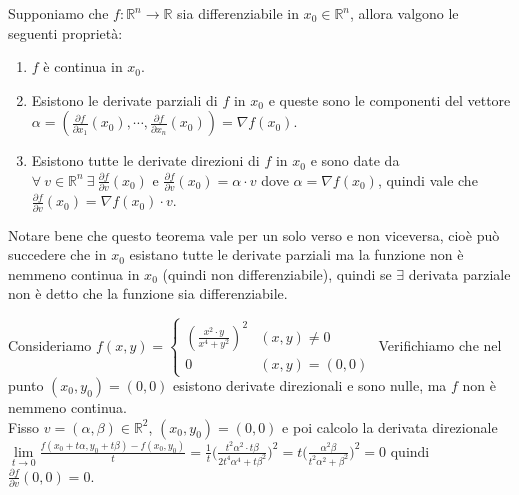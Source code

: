 \begin{theorem}\label{teorema-differenziabilità}
Supponiamo che $f: \mathbb{R}^n \to \mathbb{R}$ sia differenziabile in $x_0 \in \mathbb{R}^n$, allora valgono le seguenti proprietà:
\begin{enumerate}
    \item $f$ è continua in $x_0$.
    \item Esistono le derivate parziali di $f$ in $x_0$ e queste sono le componenti del vettore $\alpha = (\frac{\partial f}{\partial x_1}(x_0), \cdots, \frac{\partial f}{\partial x_n}(x_0)) = \nabla f(x_0)$.
    \item Esistono tutte le derivate direzioni di $f$ in $x_0$ e sono date da $\forall \: v \in \mathbb{R}^n \: \exists \: \frac{\partial f}{\partial v}(x_0)$ e $\frac{\partial f}{\partial v}(x_0) = \alpha \cdot v$ dove $\alpha = \nabla f(x_0)$, quindi vale che $\frac{\partial f}{\partial v}(x_0) = \nabla f(x_0) \cdot v$.
\end{enumerate}
\end{theorem}

\begin{note}
Notare bene che questo teorema vale per un solo verso e non viceversa, cioè può succedere che in $x_0$ esistano tutte le derivate parziali ma la funzione non è nemmeno continua in $x_0$ (quindi non differenziabile), quindi se $\exists$ derivata parziale non è detto che la funzione sia differenziabile.
\end{note}

\begin{example}
Consideriamo $f(x,y) = \begin{cases}(\frac{x^2 \cdot y}{x^4 + y^2})^2 & (x,y) \neq 0 \\ 0 & (x,y) = (0,0)\end{cases}$ Verifichiamo che nel punto $(x_0, y_0) = (0,0)$ esistono derivate direzionali e sono nulle, ma $f$ non è nemmeno continua.\\
Fisso $v = (\alpha, \beta) \in \mathbb{R}^2$, $(x_0, y_0) = (0,0)$ e poi calcolo la derivata direzionale $\lim\limits_{t \to 0}\frac{f(x_0 + t\alpha, y_0 + t\beta) - f(x_0,y_0)}{t} = \frac{1}{t}\bigg(\frac{t^2\alpha^2 \cdot t\beta}{2t^4\alpha^4 + t\beta^2}\bigg)^2 = t\bigg(\frac{\alpha^2\beta}{t^2\alpha^2 + \beta^2}\bigg)^2 = 0$ quindi $\frac{\partial f}{\partial v}(0,0) = 0$.
\end{example}

